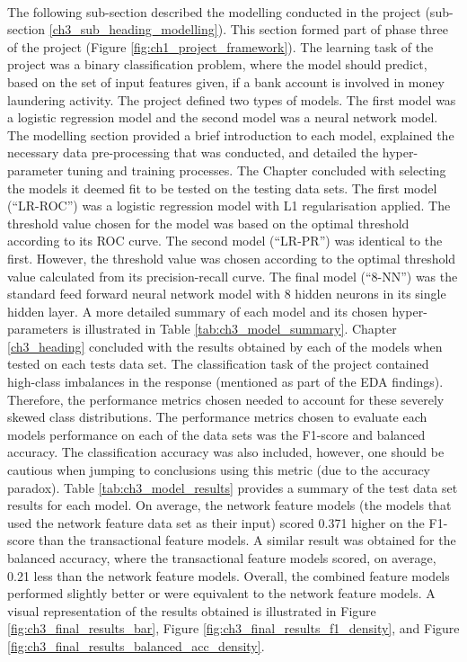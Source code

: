 \\
The following sub-section described the modelling conducted in the project (sub-section \ref{ch3_sub_heading_modelling}). This section formed part of phase three of the project (Figure \ref{fig:ch1_project_framework}). The learning task of the project was a binary classification problem, where the model should predict, based on the set of input features given, if a bank account is involved in money laundering activity. The project defined two types of models. The first model was a logistic regression model and the second model was a neural network model. The modelling section provided a brief introduction to each model, explained the necessary data pre-processing that was conducted, and detailed the hyper-parameter tuning and training processes. The Chapter concluded with selecting the models it deemed fit to be tested on the testing data sets. The first model (``LR-ROC'') was a logistic regression model with L1 regularisation applied. The threshold value chosen for the model was based on the optimal threshold according to its ROC curve. The second model (``LR-PR'')  was identical to the first. However, the threshold value was chosen according to the optimal threshold value calculated from its precision-recall curve. The final model (``8-NN'') was the standard feed forward neural network model with 8 hidden neurons in its single hidden layer. A more detailed summary of each model and its chosen hyper-parameters is illustrated in Table \ref{tab:ch3_model_summary}.
Chapter \ref{ch3_heading} concluded with the results obtained by each of the models when tested on each tests data set. The classification task of the project contained high-class imbalances in the response (mentioned as part of the EDA findings). Therefore, the performance metrics chosen needed to account for these severely skewed class distributions. The performance metrics chosen to evaluate each models performance on each of the data sets was the F1-score and balanced accuracy. The classification accuracy was also included, however, one should be cautious when jumping to conclusions using this metric (due to the accuracy paradox). Table \ref{tab:ch3_model_results} provides a summary of the test data set results for each model. On average, the network feature models (the models that used the network feature data set as their input) scored 0.371 higher on the F1-score than the transactional feature models. A similar result was obtained for the balanced accuracy, where the transactional feature models scored, on average, 0.21 less than the network feature models. Overall, the combined feature models performed slightly better or were equivalent to the network feature models. A visual representation of the results obtained is illustrated in Figure \ref{fig:ch3_final_results_bar}, Figure \ref{fig:ch3_final_results_f1_density}, and Figure \ref{fig:ch3_final_results_balanced_acc_density}.

